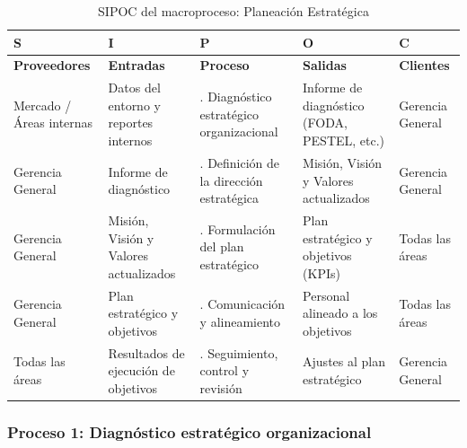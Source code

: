 \documentclass[11pt, a4paper, oneside]{report}
\begin{document}
\begin{table}[H]
\centering\small
\renewcommand{\arraystretch}{1.3}
\setlength{\tabcolsep}{4pt}
\begin{tabularx}{\textwidth}{|>{\raggedright\arraybackslash}p{}|>{\raggedright\arraybackslash}p{}|>{\raggedright\arraybackslash}p{}|>{\raggedright\arraybackslash}p{}|>{\raggedright\arraybackslash}X|}
\hline
\rowcolor{upeu_dark}
\color{white}\bfseries S & \color{white}\bfseries I & \color{white}\bfseries P & \color{white}\bfseries O & \color{white}\bfseries C \\ \hline
\rowcolor{upeu_light}
\bfseries Proveedores & \bfseries Entradas & \bfseries Proceso & \bfseries Salidas & \bfseries Clientes \\ \hline
Mercado / Áreas internas &
Datos del entorno y reportes internos &
1. Diagnóstico estratégico organizacional &
Informe de diagnóstico (FODA, PESTEL, etc.) &
Gerencia General \\ \hline
\rowcolor{gray!10}
Gerencia General &
Informe de diagnóstico &
2. Definición de la dirección estratégica &
Misión, Visión y Valores actualizados &
Gerencia General \\ \hline
Gerencia General &
Misión, Visión y Valores actualizados &
3. Formulación del plan estratégico &
Plan estratégico y objetivos (KPIs) &
Todas las áreas \\ \hline
\rowcolor{gray!10}
Gerencia General &
Plan estratégico y objetivos &
4. Comunicación y alineamiento &
Personal alineado a los objetivos &
Todas las áreas \\ \hline
Todas las áreas &
Resultados de ejecución de objetivos &
5. Seguimiento, control y revisión &
Ajustes al plan estratégico &
Gerencia General \\ \hline
\end{tabularx}
\caption{SIPOC del macroproceso: Planeación Estratégica}
\end{table}

\subsubsection{Proceso 1: Diagnóstico estratégico organizacional}
\end{document}
